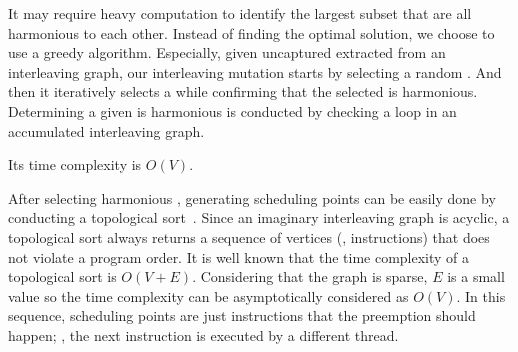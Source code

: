 It may require heavy computation to identify the largest subset that
are all harmonious to each other.
%
Instead of finding the optimal solution, we choose to use a greedy
algorithm.
%
Especially, given uncaptured \segments extracted from an interleaving
graph, our interleaving mutation starts by selecting a random
\segment.
%
And then it iteratively selects a \segment while confirming that the
selected \segment is harmonious.
%
Determining a given \segment is harmonious is conducted by checking a
loop in an accumulated interleaving graph.

Its time complexity is $O(V)$.


%
After selecting harmonious \segments, generating scheduling points can
be easily done by conducting a topological
sort~\cite{topologicalsort}.
%
Since an imaginary interleaving graph is acyclic, a topological sort
always returns a sequence of vertices (\ie, instructions) that does
not violate a program order.
%
It is well known that the time complexity of a topological sort is
$O(V+E)$. Considering that the graph is sparse, $E$ is a small value
so the time complexity can be asymptotically considered as $O(V)$.
%
In this sequence, scheduling points are just instructions that the
preemption should happen; \ie, the next instruction is executed by a
different thread.
%





